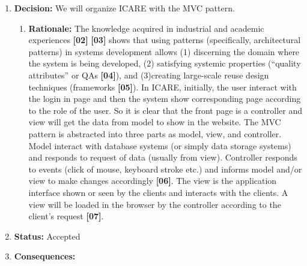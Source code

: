 \documentclass[a4paper,12pt]{report}
\begin{document}
\begin{enumerate}
    \item \textbf{Decision:} 
    \newline\newline We will organize ICARE with the MVC pattern.
    
    \begin{enumerate}
        \item{\textbf{Rationale:}}  
        \newline\newline The knowledge acquired in industrial and academic experiences \textbf{[02]} \textbf{[03]} shows that using patterns (specifically, architectural patterns) in systems development allows (1) discerning the domain where the system is being developed, (2) satisfying systemic properties (“quality attributes” or QAs \textbf{[04]}), and (3)creating large-scale reuse design techniques (frameworks \textbf{[05]}). In ICARE, initially, the user interact with the login in page and then the system show corresponding page according to the role of the user. So it is clear that the front page is a controller and view will get the data from model to show in the website. The MVC pattern is abstracted into three parts as model, view, and controller. Model interact with database systems (or simply data storage systems) and responds to request of data (usually from view). Controller responds to events (click  of  mouse, keyboard stroke etc.) and informs model and/or view to make changes accordingly \textbf{[06]}. The view is the application interface shown or seen by the clients and interacts with the clients. A view will be loaded in the browser by the controller according to the client’s request \textbf{[07]}.
    \end{enumerate}
    
    \item \textbf{Status:} 
    \newline\newline Accepted
    
    \item \textbf{Consequences:} 
    

\end{enumerate}
\end{document}
